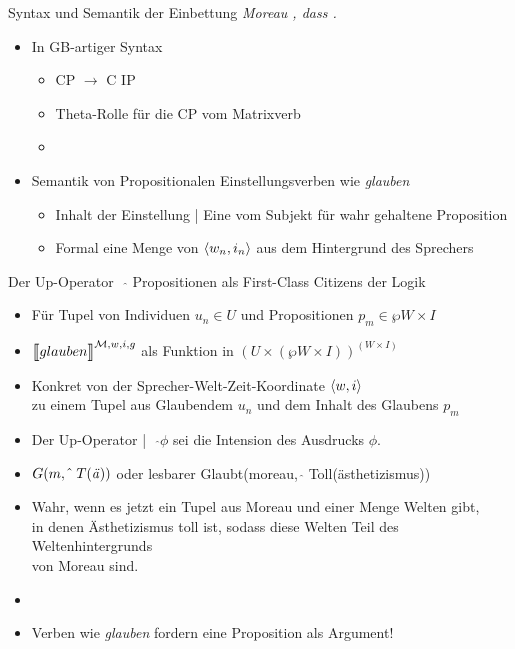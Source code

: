 \begin{frame}
  {Syntax und Semantik der Einbettung}
  \onslide<+->
  \onslide<+->
  \textit{Moreau , \alert{dass} .}\\
  \Halbzeile
  \begin{itemize}[<+->]
    \item In GB-artiger Syntax
      \begin{itemize}[<+->]
        \item \alert{CP $\rightarrow$ C IP}
        \item Theta-Rolle für die CP vom Matrixverb
        \item {}
      \end{itemize}
      \Halbzeile
    \item Semantik von \alert{Propositionalen Einstellungsverben} wie \textit{glauben}
      \begin{itemize}[<+->]
        \item Inhalt der Einstellung | Eine vom Subjekt für wahr gehaltene Proposition
        \item Formal \alert{eine Menge von ${\langle{}w_n,i_n\rangle}$ aus dem Hintergrund des Sprechers}
      \end{itemize}
  \end{itemize}
\end{frame}

\begin{frame}
  {Der Up-Operator\ \ $\hat{ }$}
  \onslide<+->
  \onslide<+->
  Propositionen  als First-Class Citizens der Logik\\
  \Halbzeile
  \begin{itemize}[<+->]
    \item Für Tupel von \alert{Individuen $u_n\in U$} und \alert{Propositionen $p_m\in\wp W\times I$}
    \item $\DEMM{glauben}$ als \alert{Funktion in $(U\times(\wp W\times I))^{(W\times I)}$}
    \item Konkret von der Sprecher-Welt-Zeit-Koordinate ${\langle{}w,i\rangle}$\\
      zu einem Tupel aus Glaubendem $u_n$ und dem Inhalt des Glaubens $p_m$
      \Halbzeile
    \item Der Up-Operator |\ \ \alert{$\hat{ }\phi$} sei die \alert{Intension des Ausdrucks $\phi$}.
    \item \alert{$G(m, \hat{\ }\ T(\text{\textit{ä}}))$} oder lesbarer \alert{Glaubt(moreau, $\hat{\ }\ $Toll(ästhetizismus))}
    \item Wahr, wenn es jetzt ein Tupel aus Moreau und einer Menge Welten gibt,\\
      in denen Ästhetizismus toll ist, sodass diese Welten Teil des Weltenhintergrunds\\
      von Moreau sind.
    \item {}
    \item Verben wie \textit{glauben} fordern eine Proposition als Argument!
  \end{itemize}
\end{frame}

